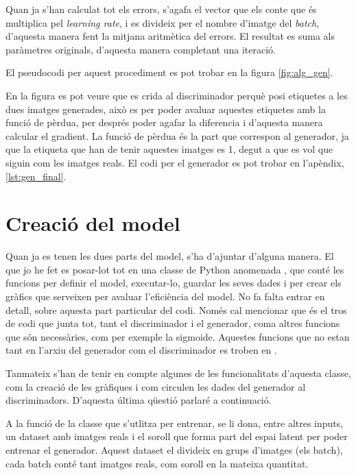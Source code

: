 Quan ja s'han calculat tot els errors, s'agafa el vector que els conte que és multiplica pel \textit{learning rate}, i es divideix per el nombre d'imatge del \textit{batch}, d'aquesta manera fent la mitjana aritmètica del errors. El resultat es suma als paràmetres originals, d'aquesta manera completant una iteració. 

El pseudocodi per aquest procediment es pot trobar en la figura \ref{fig:alg_gen}. 
 
En la figura es pot veure que es crida al discriminador perquè posi etiquetes a les dues imatges generades, això es per poder avaluar aquestes etiquetes amb la funció de pèrdua, per després poder agafar la diferencia i d'aquesta manera calcular el gradient. La funció de pèrdua és la part que correspon al generador, ja que la etiqueta que han de tenir aquestes imatges es 1, degut a que es vol que siguin com les imatges reals. El codi per el generador es pot trobar en l'apèndix, \ref{lst:gen_final}.

\section{Creació del model}

Quan ja es tenen les dues parts del model, s'ha d'ajuntar d'alguna manera. El que jo he fet es posar-lot tot en una classe de Python anomenada , que conté les funcions per definir el model, executar-lo, guardar les seves dades i per crear els gràfics que serveixen per avaluar l'eficiència del model. No fa falta entrar en detall, sobre aquesta part particular del codi. Només cal mencionar que és el tros de codi que junta tot, tant el discriminador i el generador, coma altres funcions que són necessàries, com per exemple la sigmoide. Aquestes funcions que no estan tant en l'arxiu del generador com el discriminador es troben en . 

Tanmateix s'han de tenir en compte algunes de les funcionalitats d'aquesta classe, com la creació de les gràfiques i com circulen les dades del generador al discriminadors. D'aquesta última qüestió parlaré a continuació. 

A la funció de la classe  que s'utlitza per entrenar,  se li dona, entre altres inputs, un dataset amb imatges reals i el soroll que forma part del espai latent per poder entrenar el generador. Aquest dataset el divideix en grups d'imatges (els batch), cada batch conté tant imatges reals, com soroll en la mateixa quantitat.

